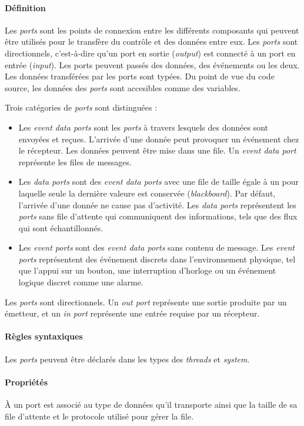\documentclass[11pt,a4paper]{paper}
\begin{document}
\begin{appendices}
\paragraph{Définition} Les {\em ports} sont les points de connexion entre les différents composants qui peuvent être utilisés pour le transfère du contrôle et des données entre eux. Les {\em ports} sont directionnels, c'est-à-dire qu'un port en sortie ({\em output}) est connecté à un port en entrée ({\em input}). Les ports peuvent passés des données, des événements ou les deux. Les données transférées par les ports sont typées. Du point de vue du code source, les données des {\em ports} sont accesibles comme des variables.

Trois catégories de {\em ports} sont distinguées :
\begin{itemize}
\item Les {\em event data ports} sont les {\em ports} à travers lesquels des données sont envoyées et reçues. L'arrivée d'une donnée peut provoquer un événement chez le récepteur. Les données peuvent être mise dans une file. Un {\em event data port} représente les files de messages.
\item Les {\em data ports} sont des {\em event data ports} avec une file de taille égale à un pour laquelle seule la dernière valeure est conservée ({\em blackboard}). Par défaut, l'arrivée d'une donnée ne cause pas d'activité. Les {\em data ports} représentent les {\em ports} sans file d'attente qui communiquent des informations, tels que des flux qui sont échantillonnés.
\item Les {\em event ports} sont des {\em event data ports} sans contenu de message. Les {\em event ports} représentent des événement discrets dans l'environnement physique, tel que l'appui sur un bouton, une interruption d'horloge ou un événement logique discret comme une alarme.
\end{itemize}

Les {\em ports} sont directionnels. Un {\em out port} représente une sortie produite par un émetteur, et un {\em in port} représente une entrée requise par un récepteur.

\paragraph{Règles syntaxiques} Les {\em ports} peuvent être déclarés dans les types des {\em threads} et {\em system}.

\paragraph{Propriétés} \`A un port est associé au type de données qu'il transporte ainsi que la taille de sa file d'attente et le protocole utilisé pour gérer la file.


\end{appendices}
\end{document}
